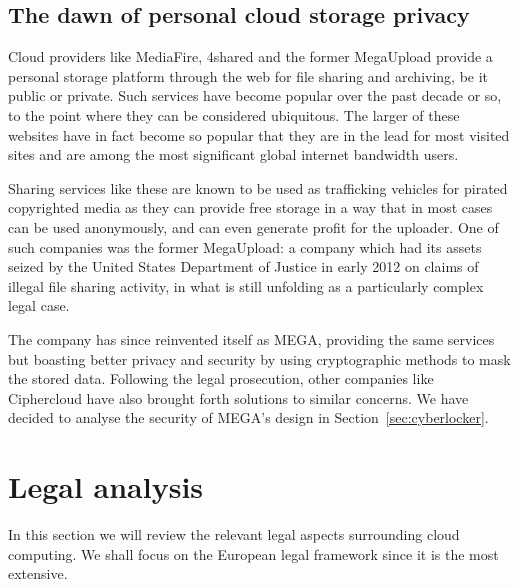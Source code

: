 \documentclass[11pt]{article}
\begin{document}

\subsection{The dawn of personal cloud storage privacy}
Cloud providers like MediaFire, 4shared and the former MegaUpload provide a personal storage platform through the web for file sharing and archiving, be it public or private.
Such services have become popular over the past decade or so, to the point where they can be considered ubiquitous.
The larger of these websites have in fact become so popular that they are in the lead for most visited sites and are among the most significant global internet bandwidth users.

Sharing services like these are known to be used as trafficking vehicles for pirated copyrighted media as they can provide free storage in a way that in most cases can be used anonymously, and can even generate profit for the uploader.
One of such companies was the former MegaUpload: a company which had its assets seized by the United States Department of Justice in early 2012 on claims of illegal file sharing activity, in what is still unfolding as a particularly complex legal case.


The company has since reinvented itself as MEGA, providing the same services but boasting better privacy and security by using cryptographic methods to mask the stored data.
Following the legal prosecution, other companies like Ciphercloud have also brought forth solutions to similar concerns.
We have decided to analyse the security of MEGA's design in Section~\autoref{sec:cyberlocker}.


\section{Legal analysis}
\label{sec:legal_analysis}

In this section we will review the relevant legal aspects surrounding cloud computing. We shall focus on the European legal framework since it is the most extensive.
\end{document}
